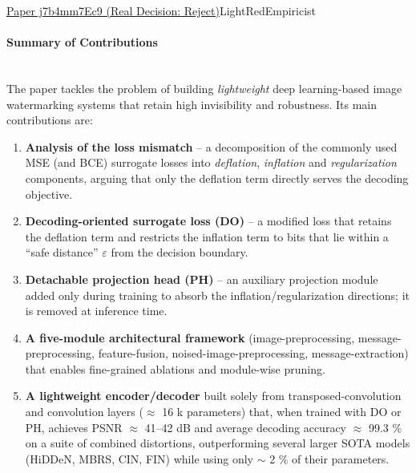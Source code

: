 \documentclass{article} %
\begin{document}
\begin{reviewbox}{\href{https://openreview.net/forum?id=j7b4mm7Ec9}{Paper j7b4mm7Ec9 (Real Decision: Reject)}}{LightRed}{Empiricist}
\scriptsize
\paragraph{Summary of Contributions}
\leavevmode\\[0.1em]
The paper tackles the problem of building \textit{lightweight} deep learning-based image watermarking systems that retain high invisibility and robustness.  
Its main contributions are:

\begin{enumerate}[leftmargin=0.5em, itemsep=0pt, topsep=0pt]
    \item \textbf{Analysis of the loss mismatch} – a decomposition of the commonly used MSE (and BCE) surrogate losses into \textit{deflation}, \textit{inflation} and \textit{regularization} components, arguing that only the deflation term directly serves the decoding objective.  
    \item \textbf{Decoding-oriented surrogate loss (DO)} – a modified loss that retains the deflation term and restricts the inflation term to bits that lie within a “safe distance” $\varepsilon$ from the decision boundary.  
    \item \textbf{Detachable projection head (PH)} – an auxiliary projection module added only during training to absorb the inflation/regularization directions; it is removed at inference time.  
    \item \textbf{A five-module architectural framework} (image-preprocessing, message-preprocessing, feature-fusion, noised-image-preprocessing, message-extraction) that enables fine-grained ablations and module-wise pruning.  
    \item \textbf{A lightweight encoder/decoder} built solely from transposed-convolution and convolution layers ($\approx$ 16 k parameters) that, when trained with DO or PH, achieves PSNR $\approx$ 41–42 dB and average decoding accuracy $\approx$ 99.3 \% on a suite of combined distortions, outperforming several larger SOTA models (HiDDeN, MBRS, CIN, FIN) while using only $\sim$ 2 \% of their parameters.
\end{enumerate}


\end{reviewbox}
\end{document}
